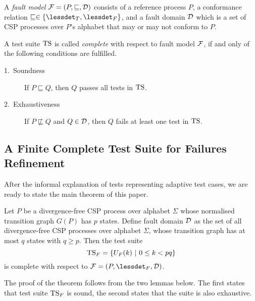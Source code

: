 A \emph{fault model} ${\cal F} = (P,\sqsubseteq,{\cal D})$ consists of a reference process
$P$, a conformance relation $\sqsubseteq \in \{\lessdet_T, \lessdet_F\}$, and a fault domain 
${\cal D}$ which is a set of CSP processes over $P$'s alphabet that may or may not conform to $P$.

A test suite ${\text{TS}}$ is called \emph{complete} with respect to fault model ${\cal F}$,
if and only of the following conditions are fulfilled.
\begin{description}
\item[1.~Soundness] If $P \sqsubseteq Q$, then $Q$ passes all tests in ${\text{TS}}$.
\item[2.~Exhaustiveness] If $P \not\sqsubseteq Q$ and $Q\in{\cal D}$, 
then $Q$ fails at least one test in ${\text{TS}}$.
\end{description} 


\subsection{A Finite Complete Test Suite for Failures Refinement}

After the informal explanation of tests representing adaptive test cases, we are ready to state the main theorem of this paper.

\begin{theorem}\label{th:failurestest}
Let $P$ be a divergence-free CSP process over alphabet $\Sigma$
whose normalised transition graph $G(P)$ has $p$ states. Define fault domain ${\cal D}$ as
the set of all divergence-free CSP processes over alphabet $\Sigma$, whose transition graph
has at most $q$ states with $q \ge p$.
Then the test suite
\[
{\text{TS}}_F = \{ U_F(k)~|~0 \le k < pq  \}
\]
is complete with respect to ${\cal F} = (P,\lessdet_F,{\cal D})$.
\end{theorem}


The proof of the theorem follows from the two lemmas below. The first states that test
suite ${\text{TS}}_F$ is sound, the second states that the suite is also exhaustive.

